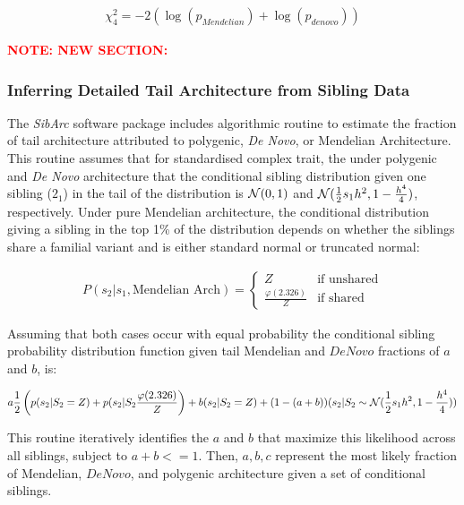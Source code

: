 \documentclass[12pt]{zHenriquesLab-StyleBioRxiv}
\newcommand\note[1]{\textbf{\textcolor{red}{\scriptsize{NOTE: #1}}}}
\begin{document}
\begin{align*}
    \chi^2_4 = -2(\log(p_{Mendelian}) + \log(p_{de novo}))
\end{align*}


\note{NEW SECTION:} 
\subsubsection*{Inferring Detailed Tail Architecture from Sibling Data} 

The \textit{SibArc} software package \cite{Souaiaia2024} includes algorithmic routine to 
estimate the fraction of tail architecture attributed to polygenic, \textit{De Novo}, 
or Mendelian Architecture.  This routine assumes that for standardised complex trait, the 
under polygenic and \textit{De Novo} architecture that the conditional sibling distribution 
given one sibling ($2_1$) in the tail of the distribution is $\mathcal{N}(0,1)$ and 
$\mathcal{N}(\frac{1}{2}s_1 h^2,1 - \frac{h^4}{4})$, respectively.  Under pure Mendelian architecture,  
the conditional distribution giving a sibling in the top 1\% of the distribution depends on 
whether the siblings share a familial variant and is either standard normal or truncated normal: %

\begin{align*}
P(s_2 | s_1, \text{Mendelian Arch}) = 
\begin{cases}
    Z & \text{if unshared} \\
    \frac{\varphi(2.326)}{Z} & \text{if shared}
\end{cases} 
\end{align*}

Assuming that both cases occur with equal probability the conditional sibling 
probability distribution function given tail Mendelian and $De Novo$ fractions of $a$ and $b$, is: 

\begin{align*}
    a\frac{1}{2}\left(p(s_2 | S_2 = Z)  + p(s_2 |  S_2 \frac{\varphi(2.326)}{Z} \right) + b(s_2| S_2 = Z) + (1-(a+b))(s_2 | S_2 \sim \mathcal{N}(\frac{1}{2}s_1 h^2,1 - \frac{h^4}{4}))
\end{align*}

This routine iteratively identifies the $a$ and $b$ that maximize this likelihood across all siblings, subject to $a+b<=1$.  
Then, $a,b,c$ represent the most likely fraction of Mendelian, $De Novo$, and polygenic architecture given a set of conditional siblings. 
\end{document}
